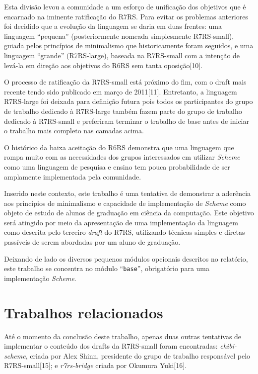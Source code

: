 Esta divisão levou a comunidade a um esforço de unificação dos objetivos que
é encarnado na iminente ratificação do \acs{R7RS}. Para evitar os
problemas anteriores foi decidido que a evolução da linguagem se daria em duas
frentes: uma linguagem ``pequena'' (posteriormente nomeada simplesmente
\acs{R7RS}-small), guiada pelos princípios de minimalismo que historicamente
foram seguidos, e uma linguagem ``grande'' (\acs{R7RS}-large), baseada na
R7RS-small com a intenção de levá-la em direção aos objetivos do \acs{R6RS}
sem tanta oposição[10]. 

O processo de ratificação da \acs{R7RS}-small está próximo do fim, com o draft
mais recente tendo sido publicado em março de 2011[11]. Entretanto, a linguagem
\acs{R7RS}-large foi deixada para definição futura pois todos os
participantes do grupo de trabalho dedicado à \acs{R7RS}-large também fazem
parte do grupo de trabalho dedicado à \acs{R7RS}-small e preferiram terminar o
trabalho de base antes de iniciar o trabalho mais completo nas camadas acima.

O histórico da baixa aceitação do \acs{R6RS} demonstra que uma linguagem que
rompa muito com as necessidades dos grupos interessados em utilizar
\textit{Scheme} como uma linguagem de pesquisa e ensino tem pouca probabilidade
de ser amplamente implementada pela comunidade.

Inserido neste contexto, este trabalho é uma tentativa de demonstrar a
aderência aos princípios de minimalismo e capacidade de implementação de
\textit{Scheme} como objeto de estudo de alunos de graduação em ciência da
computação. Este objetivo será atingido por meio da apresentação de uma
implementação  da linguagem como descrita pelo terceiro \textit{draft} do
\acs{R7RS}, utilizando técnicas simples e diretas passíveis de serem abordadas
por um aluno de graduação.

Deixando de lado os diversos pequenos módulos opcionais descritos no relatório,
este trabalho se concentra no módulo ``\texttt{base}'', obrigatório para uma
implementação \textit{Scheme}.


\section{Trabalhos relacionados}
\label{sec:trabalhos_relacionados}

Até o momento da conclusão deste trabalho, apenas duas outras tentativas de
implementar o conteúdo dos drafts da \acs{R7RS}-small foram encontradas:
\textit{chibi-scheme}, criada por Alex Shinn, presidente do grupo de trabalho
responsável pelo \acs{R7RS}-small[15]; e \textit{r7rs-bridge} criada por
Okumura Yuki[16].

